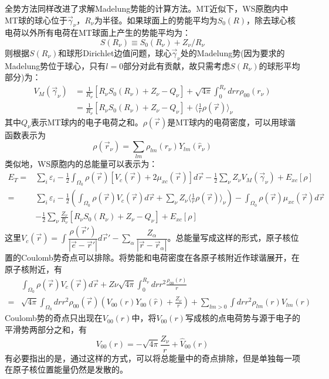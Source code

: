 全势方法同样改进了求解Madelung势能的计算方法\cite{JMP22-2433_1981}。MT近似下，WS原胞内中MT球的球心位于$\vec\gamma_{\nu}$，$R_{\nu}$为半径。如果球面上的势能平均为$S_0(R)$，除去球心核电荷以外所有电荷在MT球面上产生的势能平均为：
\begin{equation}
  S(R_{\nu})\equiv S_0(R_{\nu})+Z_{\nu}/R_{\nu}
  \label{eq:solid-79}
\end{equation}
则根据$S(R_{\nu})$和球形Dirichlet边值问题\cite{JMP22-2433_1981}，球心$\vec\gamma_{\nu}$处的Madelung势(因为要求的Madelung势位于球心，只有$l=0$部分对此有贡献，故只需考虑$S(R_{\nu})$的球形平均部分)为\cite{PRB26-4571_1982}：
\begin{equation}
  \begin{split}
   V_M(\vec\gamma_{\nu})&=\frac1{R_{\nu}}[R_{\nu}S_0(R_{\nu})+Z_{\nu}-Q_{\nu}]+\sqrt{4\pi}\int_0^{R_{\nu}}drr\rho_{00}(r_{\nu})\\
   &=\frac1{R_{\nu}}[R_{\nu}S_0(R_{\nu})+Z_{\nu}-Q_{\nu}]+\bigg\langle\frac1r\rho(\vec r)\bigg\rangle_{\nu}
  \end{split}
   \label{eq:Madelung}
\end{equation}
其中$Q_{\nu}$表示MT球内的电子电荷之和。$\rho(\vec r)$是MT球内的电荷密度，可以用球谐函数表示为
\begin{equation}
  \rho(\vec r_{\nu})=\sum_{lm}\rho_{lm}(r_{\nu})Y_{lm}(\hat r_{\nu})
  \label{eq:solid-80}
\end{equation}
类似地，WS原胞内的总能量可以表示为：
\begin{equation}
  \begin{split}
   E_T=&\sum_i\varepsilon_i-\frac12\int_{\Omega_0}\rho(\vec r)[V_c(\vec r)+2\mu_{xc}(\vec r)]d\vec r-\frac12\sum_{\nu}Z_{\nu}V_M(\vec\gamma_{\nu})+E_{xc}[\rho] \\
   =&\sum_i\varepsilon_i-\frac12\left(\int_{\Omega_0}\rho(\vec r)V_c(\vec r)d\vec r+\sum_{\nu}Z_{\nu}\bigg\langle\frac1r\rho(\vec r)\bigg\rangle_{\nu}\right)-\int_{\Omega_0}\rho(\vec r)\mu_{xc}(\vec r)d\vec r\\
   &-\frac12\sum_{\nu}\frac{Z_{\nu}}{R_{\nu}}[R_{\nu}S_0(R_{\nu})+Z_{\nu}-Q_{\nu}]+E_{xc}[\rho]
  \end{split}
  \label{eq:solid-81}
\end{equation}
这里$V_c(\vec r)=\int\dfrac{\rho(\vec r')}{|\vec e-\vec r'|}d\vec r'-\sum\limits_{\alpha}\dfrac{Z_{\alpha}}{|\vec r-\vec r_{\alpha}|}$。总能量写成这样的形式，原子核位置的Coulomb势奇点可以排除。将势能和电荷密度在各原子核附近作球谐展开，在原子核附近，有
\begin{displaymath}
  \begin{split}
    &\int_{\Omega_0}\rho(\vec r)V_c(\vec r)d\vec r+Z{\nu}\sqrt{4\pi}\int_0^{R_{\nu}}drr^2\frac{\rho_{00}(r)}r\\
    =&\sqrt{4\pi}\int_{\Omega_0}drr^2\rho_{00}(\vec r)\left(V_{00}(r)Y_{00}(\hat r)+\frac{Z_{\nu}}r\right)+\sum_{lm>0}\int drr^2\rho_{lm}(r)V_{lm}(r)
  \end{split}
\end{displaymath}
Coulomb势的奇点只出现在$V_{00}(r)$中，将$V_{00}(r)$写成核的点电荷势与源于电子的平滑势两部分之和，有
$$V_{00}(r)=-\sqrt{4\pi}\frac{Z_{\nu}}r+\hat V_{00}(r)$$
有必要指出的是，通过这样的方式，可以将总能量中的奇点排除，但是单独每一项在原子核位置能量仍然是发散的。

